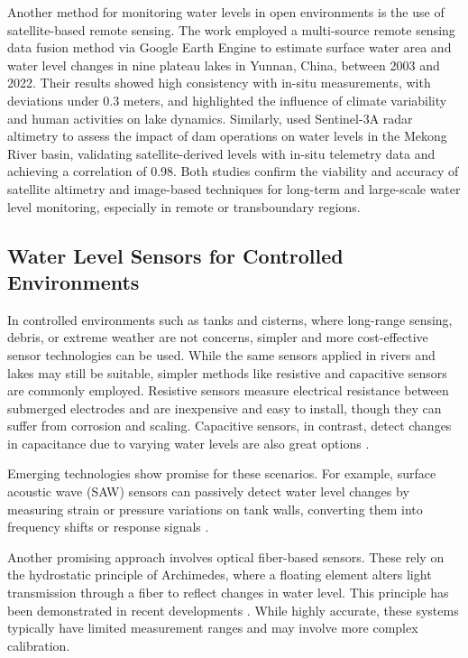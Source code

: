 \documentclass[conference]{IEEEtran}
\begin{document}
Another method for monitoring water levels in open environments is the use of satellite-based remote sensing. The work \cite{jiang_2024_monitoring} employed a multi-source remote sensing data fusion method via Google Earth Engine to estimate surface water area and water level changes in nine plateau lakes in Yunnan, China, between 2003 and 2022. Their results showed high consistency with in-situ measurements, with deviations under 0.3 meters, and highlighted the influence of climate variability and human activities on lake dynamics. Similarly, \cite{ali_2024_satellite} used Sentinel-3A radar altimetry to assess the impact of dam operations on water levels in the Mekong River basin, validating satellite-derived levels with in-situ telemetry data and achieving a correlation of 0.98. Both studies confirm the viability and accuracy of satellite altimetry and image-based techniques for long-term and large-scale water level monitoring, especially in remote or transboundary regions.

\subsection{Water Level Sensors for Controlled Environments}

In controlled environments such as tanks and cisterns, where long-range sensing, debris, or extreme weather are not concerns, simpler and more cost-effective sensor technologies can be used. While the same sensors applied in rivers and lakes may still be suitable, simpler methods like resistive and capacitive sensors are commonly employed. Resistive sensors measure electrical resistance between submerged electrodes and are inexpensive and easy to install, though they can suffer from corrosion and scaling. Capacitive sensors, in contrast, detect changes in capacitance due to varying water levels are also great options \cite{santana_2024_development, mohindru_2023_development}.

Emerging technologies show promise for these scenarios. For example, surface acoustic wave (SAW) sensors can passively detect water level changes by measuring strain or pressure variations on tank walls, converting them into frequency shifts or response signals \cite{ali_2020_saw, sreejith_2024_modeling}.

Another promising approach involves optical fiber-based sensors. These rely on the hydrostatic principle of Archimedes, where a floating element alters light transmission through a fiber to reflect changes in water level. This principle has been demonstrated in recent developments \cite{ramos_2025_high}. While highly accurate, these systems typically have limited measurement ranges and may involve more complex calibration.
\end{document}
